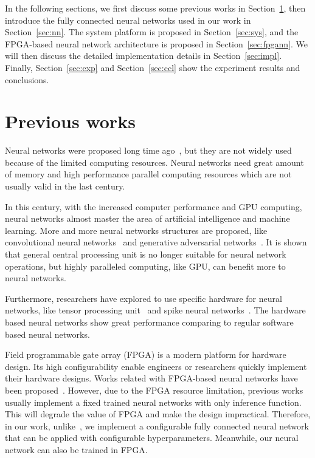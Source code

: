 \documentclass[conference]{IEEEtran}
\begin{document}
In the following sections, we first discuss some previous works in Section~\ref{sec:prev}, then introduce the fully connected neural networks used in our work in Section~\ref{sec:nn}. The system platform is proposed in Section~\ref{sec:sys}, and the FPGA-based neural network architecture is proposed in Section~\ref{sec:fpgann}. We will then discuss the detailed implementation details in Section~\ref{sec:impl}. Finally, Section~\ref{sec:exp} and Section~\ref{sec:ccl} show the experiment results and conclusions.

\section{Previous works}
\label{sec:prev}
Neural networks were proposed long time ago~\cite{nn88,nn89,nn91}, but they are not widely used because of the limited computing resources. Neural networks need great amount of memory and high performance parallel computing resources which are not usually valid in the last century. 

In this century, with the increased computer performance and GPU computing, neural networks almost master the area of artificial intelligence and machine learning. More and more neural networks structures are proposed, like convolutional neural networks~\cite{convnet} and generative adversarial networks~\cite{gan}.  It is shown that general central processing unit is no longer suitable for neural network operations, but highly paralleled computing, like GPU, can benefit more to neural networks.

Furthermore, researchers have explored to use specific hardware for neural networks, like tensor processing unit~\cite{tpu,tpu2} and spike neural networks~\cite{spike}.  The hardware based neural networks show great performance comparing to regular software based neural networks. 

Field programmable gate array (FPGA) is a modern platform for hardware design. Its high configurability enable engineers or researchers quickly implement their hardware designs. Works related with FPGA-based neural networks have been proposed~\cite{hytnh17,seok02}. However, due to the FPGA resource limitation, previous works usually implement a fixed trained neural networks with only inference function. This will degrade the value of FPGA and make the design impractical. Therefore, in our work, unlike~\cite{hytnh17}, we implement a configurable fully connected neural network that can be applied with configurable hyperparameters. Meanwhile, our neural network can also be trained in FPGA. 
\end{document}
